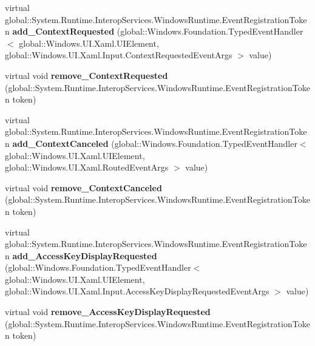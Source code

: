 \begin{DoxyCompactItemize}
virtual global\+::\+System.\+Runtime.\+Interop\+Services.\+Windows\+Runtime.\+Event\+Registration\+Token {\bfseries add\+\_\+\+Context\+Requested} (global\+::\+Windows.\+Foundation.\+Typed\+Event\+Handler$<$ global\+::\+Windows.\+U\+I.\+Xaml.\+U\+I\+Element, global\+::\+Windows.\+U\+I.\+Xaml.\+Input.\+Context\+Requested\+Event\+Args $>$ value)
\item 
\mbox{\label{class_windows_1_1_u_i_1_1_xaml_1_1_u_i_element_a41e65f1fea8389643eabe21d9861a727}} 
virtual void {\bfseries remove\+\_\+\+Context\+Requested} (global\+::\+System.\+Runtime.\+Interop\+Services.\+Windows\+Runtime.\+Event\+Registration\+Token token)
\item 
\mbox{\label{class_windows_1_1_u_i_1_1_xaml_1_1_u_i_element_a10d84028f6f428f4a5c1fe8fe9501deb}} 
virtual global\+::\+System.\+Runtime.\+Interop\+Services.\+Windows\+Runtime.\+Event\+Registration\+Token {\bfseries add\+\_\+\+Context\+Canceled} (global\+::\+Windows.\+Foundation.\+Typed\+Event\+Handler$<$ global\+::\+Windows.\+U\+I.\+Xaml.\+U\+I\+Element, global\+::\+Windows.\+U\+I.\+Xaml.\+Routed\+Event\+Args $>$ value)
\item 
\mbox{\label{class_windows_1_1_u_i_1_1_xaml_1_1_u_i_element_a62c78b7595f4771d8fae8188641db45e}} 
virtual void {\bfseries remove\+\_\+\+Context\+Canceled} (global\+::\+System.\+Runtime.\+Interop\+Services.\+Windows\+Runtime.\+Event\+Registration\+Token token)
\item 
\mbox{\label{class_windows_1_1_u_i_1_1_xaml_1_1_u_i_element_a33aadbdcdc9a08239adba0ea7ca3dc2c}} 
virtual global\+::\+System.\+Runtime.\+Interop\+Services.\+Windows\+Runtime.\+Event\+Registration\+Token {\bfseries add\+\_\+\+Access\+Key\+Display\+Requested} (global\+::\+Windows.\+Foundation.\+Typed\+Event\+Handler$<$ global\+::\+Windows.\+U\+I.\+Xaml.\+U\+I\+Element, global\+::\+Windows.\+U\+I.\+Xaml.\+Input.\+Access\+Key\+Display\+Requested\+Event\+Args $>$ value)
\item 
\mbox{\label{class_windows_1_1_u_i_1_1_xaml_1_1_u_i_element_aa685659f05df9a84a04f9b4fba77ddf8}} 
virtual void {\bfseries remove\+\_\+\+Access\+Key\+Display\+Requested} (global\+::\+System.\+Runtime.\+Interop\+Services.\+Windows\+Runtime.\+Event\+Registration\+Token token)

\end{DoxyCompactItemize}
